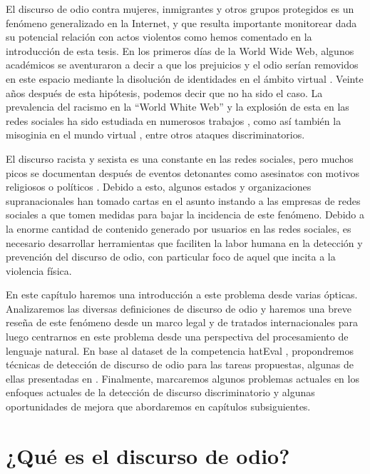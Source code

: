 \label{chap:04_hate_speech}

El discurso de odio contra mujeres, inmigrantes y otros grupos protegidos es un fenómeno generalizado en la Internet, y que resulta importante monitorear dada su potencial relación con actos violentos como hemos comentado en la introducción de esta tesis. En los primeros días de la World Wide Web, algunos académicos se aventuraron a decir a que los prejuicios y el odio serían removidos en este espacio mediante la disolución de identidades en el ámbito virtual \cite{levy2001cyberculture, rheingold1993virtual,calderon2020topic}. Veinte años después de esta hipótesis, podemos decir que no ha sido el caso. La prevalencia del racismo en la ``World White Web''  y la explosión de esta en las redes sociales ha sido estudiada en numerosos trabajos \cite{adams2005white, kettrey2014staking}, como así también la misoginia en el mundo virtual \cite{filipovic2007blogging, mantilla2013gendertrolling}, entre otros ataques discriminatorios.

El discurso racista y sexista es una constante en las redes sociales, pero muchos picos se documentan después de eventos detonantes como asesinatos con motivos religiosos o políticos \cite{burnap2015cyber}. Debido a esto, algunos estados y organizaciones supranacionales han tomado cartas en el asunto instando a las empresas de redes sociales a que tomen medidas para bajar la incidencia de este fenómeno. Debido a la enorme cantidad de contenido generado por usuarios en las redes sociales, es necesario desarrollar herramientas que faciliten la labor humana en la detección y prevención del discurso de odio, con particular foco de aquel que incita a la violencia física.


En este capítulo haremos una introducción a este problema desde varias ópticas. Analizaremos las diversas definiciones de discurso de odio y haremos una breve reseña de este fenómeno desde un marco legal y de tratados internacionales para luego centrarnos en este problema desde una perspectiva del procesamiento de lenguaje natural. En base al dataset de la competencia hatEval \cite{hateval2019semeval}, propondremos técnicas de detección de discurso de odio para las tareas propuestas, algunas de ellas presentadas en \citet{atalaya_tass2018}. Finalmente, marcaremos algunos problemas actuales en los enfoques actuales de la detección de discurso discriminatorio y algunas oportunidades de mejora que abordaremos en capítulos subsiguientes.


\section{¿Qué es el discurso de odio?}
\label{sec:hate_speech_definitions}


